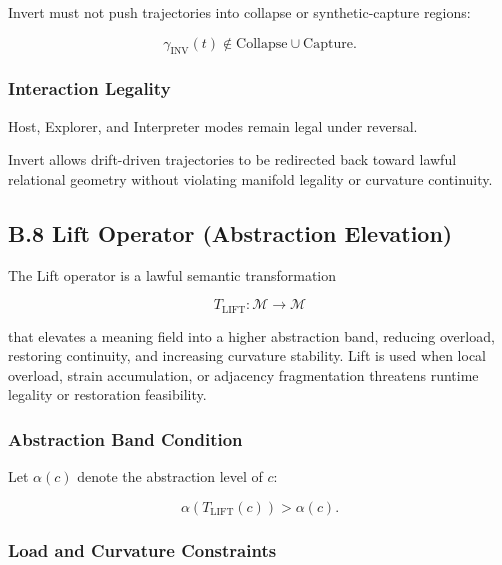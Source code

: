 Invert must not push trajectories into collapse or synthetic-capture regions:



\[
\gamma_{\mathrm{INV}}(t) \notin \text{Collapse} \cup \text{Capture}.
\]



\subsubsection*{Interaction Legality}

Host, Explorer, and Interpreter modes remain legal under reversal.

\medskip

\noindent Invert allows drift-driven trajectories to be redirected back toward
lawful relational geometry without violating manifold legality or curvature
continuity.



\subsection*{B.8 Lift Operator (Abstraction Elevation)}

\noindent The Lift operator is a lawful semantic transformation



\[
T_{\mathrm{LIFT}} : \mathcal{M} \rightarrow \mathcal{M}
\]



that elevates a meaning field into a higher abstraction band, reducing overload,
restoring continuity, and increasing curvature stability. Lift is used when
local overload, strain accumulation, or adjacency fragmentation threatens
runtime legality or restoration feasibility.

\subsubsection*{Abstraction Band Condition}

Let $\alpha(c)$ denote the abstraction level of $c$:



\[
\alpha(T_{\mathrm{LIFT}}(c)) > \alpha(c).
\]



\subsubsection*{Load and Curvature Constraints}



